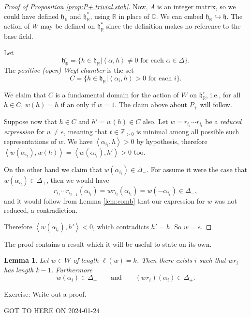 \documentclass[12pt]{article}
\theoremstyle{plain}
\newtheorem{lemma}[thm]{Lemma}
\theoremstyle{definition}
\numberwithin{equation}{section}
\newcommand{\al}{\alpha}
\newcommand{\D}{\Delta}
\newcommand{\C}{\mathbb{C}}
\newcommand{\R}{\mathbb{R}}
\newcommand{\Z}{\mathbb{Z}}
\newcommand{\h}{\mathfrak{h}}
\begin{document}
\begin{proof}[Proof of Proposition \ref{prop:P+.trivial.stab}]
Now, $A$ is an integer matrix, so we could have defined $\h_\R$ and $\h_\R^*$, using $\R$ in place of $\C$. We can embed $\h_\R \hookrightarrow \h$. The action of $W$ may be defined on $\h_\R^*$ since the definition makes no reference to the base field.

Let
\[
\h_\R^\circ = \{h \in \h_\R | \text{$\left<\al, h\right> \neq 0$ for each $\al \in \D$}\}.
\]
The \emph{positive (open) Weyl chamber} is the set
\[
C = \{h \in \h_\R | \text{$\left<\al_i, h\right> > 0$ for each $i$}\}.
\]

We claim that $C$ is a fundamental domain for the action of $W$ on $\h_\R^\circ$, i.e., for all $h \in C$, $w(h) = h$ if an only if $w = 1$. The claim above about $P_{+}$ will follow.



Suppose now that $h \in C$ and $h' = w(h) \in C$ also. Let $w = r_{i_1} \cdots r_{i_t}$ be a \emph{reduced expression} for $w \neq e$, meaning that $t \in \Z_{>0}$ is minimal among all possible such representations of $w$. We have $\left<\al_{i_t}, h\right> > 0$ by hypothesis, therefore $\left<w(\al_{i_t}), w(h)\right> = \left<w(\al_{i_t}), h'\right> > 0$ too.

On the other hand we claim that $w(\al_{i_t}) \in \D_-$. For assume it were the case that $w(\al_{i_t}) \in \D_+$, then we would have
\[
r_{i_1} \cdots r_{i_{t-1}}(\al_{i_t}) = w r_{i_t}(\al_{i_t}) = w(-\al_{i_t})\in \D_-,
\]
and it would follow from Lemma \ref{lem:comb} that our expression for $w$ was not reduced, a contradiction.

Therefore $\left< w(\al_{i_t}), h' \right> < 0$, which contradicts $h' = h$. So $w = e$.
\end{proof}


The proof contains a result which it will be useful to state on its own.
\begin{lemma}\label{lem:reduced.expression.lemma}
Let $w \in W$ of length $\ell(w) = k$. Then there exists $i$ such that $w r_i$ has length $k-1$. Furthermore
\[
w(\al_i) \in \D_- \qquad \text{and} \qquad (wr_i)(\al_i) \in \D_+.
\]
\end{lemma}

Exercise: Write out a proof.




{\color{red}GOT TO HERE ON 2024-01-24}
\end{document}
